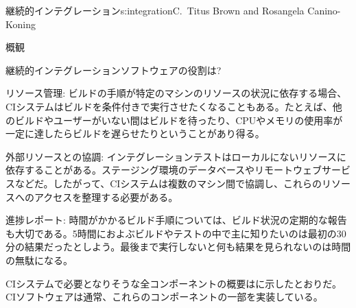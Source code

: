 \begin{aosachapter}{継続的インテグレーション}{s:integration}{C.\ Titus Brown and Rosangela Canino-Koning}
\begin{aosasect1}{概観}
\begin{aosasect2}{継続的インテグレーションソフトウェアの役割は?}
\begin{aosadescription}
  \item{リソース管理:} ビルドの手順が特定のマシンのリソースの状況に依存する場合、CIシステムはビルドを条件付きで実行させたくなることもある。たとえば、他のビルドやユーザーがいない間はビルドを待ったり、CPUやメモリの使用率が一定に達したらビルドを遅らせたりということがあり得る。

  \item{外部リソースとの協調:} インテグレーションテストはローカルにないリソースに依存することがある。ステージング環境のデータベースやリモートウェブサービスなどだ。したがって、CIシステムは複数のマシン間で協調し、これらのリソースへのアクセスを整理する必要がある。

  \item{進捗レポート:} 時間がかかるビルド手順については、ビルド状況の定期的な報告も大切である。5時間におよぶビルドやテストの中で主に知りたいのは最初の30分の結果だったとしよう。最後まで実行しないと何も結果を見られないのは時間の無駄になる。

\end{aosadescription}

CIシステムで必要となりそうな全コンポーネントの概要はに示したとおりだ。CIソフトウェアは通常、これらのコンポーネントの一部を実装している。

\end{aosasect2}


\end{aosasect1}
\end{aosachapter}
